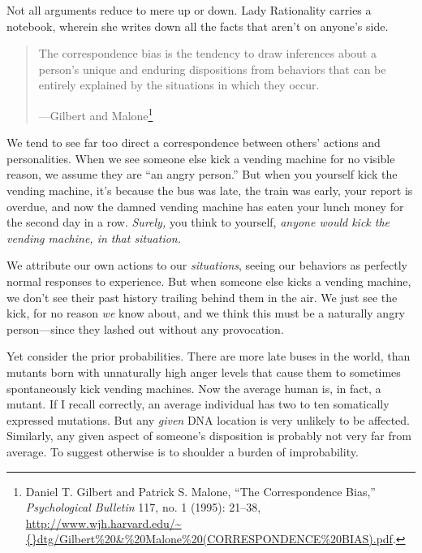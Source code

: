 {
 Not all arguments reduce to mere up or down. Lady Rationality
carries a notebook, wherein she writes down all the facts that
aren't on anyone's side.}

\myendsectiontext


\bigskip


\begin{quote}
{
 The correspondence bias is the tendency to draw inferences about a
person's unique and enduring dispositions from
behaviors that can be entirely explained by the situations in which
they occur.}

{\raggedleft
 {}---Gilbert and Malone\footnote{Daniel T. Gilbert and Patrick S. Malone, ``The
Correspondence Bias,'' \textit{Psychological
Bulletin} 117, no. 1 (1995): 21--38,
\url{http://www.wjh.harvard.edu/\~{}dtg/Gilbert\%20\&\%20Malone\%20(CORRESPONDENCE\%20BIAS).pdf}.}
\par}
\end{quote}


{
 We tend to see far too direct a correspondence between
others' actions and personalities. When we see someone
else kick a vending machine for no visible reason, we assume they are
``an angry person.'' But when you
yourself kick the vending machine, it's because the bus
was late, the train was early, your report is overdue, and now the
damned vending machine has eaten your lunch money for the second day in
a row. \textit{Surely,} you think to yourself, \textit{anyone would
kick the vending machine, in that situation.}}

{
 We attribute our own actions to our \textit{situations}, seeing
our behaviors as perfectly normal responses to experience. But when
someone else kicks a vending machine, we don't see
their past history trailing behind them in the air. We just see the
kick, for no reason \textit{we} know about, and we think this must be a
naturally angry person---since they lashed out without any
provocation.}

{
 Yet consider the prior probabilities. There are more late buses in
the world, than mutants born with unnaturally high anger levels that
cause them to sometimes spontaneously kick vending machines. Now the
average human is, in fact, a mutant. If I recall correctly, an average
individual has two to ten somatically expressed mutations. But any
\textit{given} DNA location is very unlikely to be affected. Similarly,
any given aspect of someone's disposition is probably
not very far from average. To suggest otherwise is to shoulder a burden
of improbability.}

